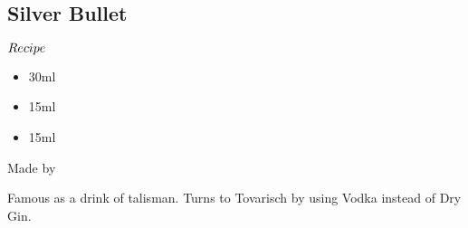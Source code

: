 \subsection{Silver Bullet}
\begin{itembox}[l]{\boldmath $Recipe$}
\begin{itemize}
\setlength{\parskip}{0cm}
\setlength{\itemsep}{0cm}
\item \gin 30ml
\item \kummel 15ml
\item \lj 15ml
\end{itemize}
\vspace{-4mm}
Made by \shake
\end{itembox}
Famous as a drink of talisman. Turns to Tovarisch by using Vodka instead of Dry Gin.
